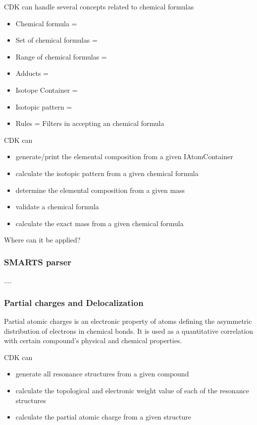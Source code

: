 \documentclass[10pt]{bmc_article}
\newenvironment{bmcformat}{\begin{raggedright}\baselineskip20pt\sloppy\setboolean{publ}{false}}{\end{raggedright}\baselineskip20pt\sloppy}
\begin{document}
\begin{bmcformat}
CDK can handle several concepts related to chemical formulas
\begin{itemize}
\item Chemical formula =
\item Set of chemical formulas =
\item Range of chemical formulas =
\item Adducts =
\item Isotope Container =
\item Isotopic pattern = 
\item Rules = Filters in accepting an chemical formula
\end{itemize}

CDK can
\begin{itemize}
\item generate/print the elemental composition from a given IAtomContainer
\item calculate the isotopic pattern from a given chemical formula
\item determine the elemental composition from a given mass
\item validate a chemical formula
\item calculate the exact mass from a given chemical formula
\end{itemize}

Where can it be applied?

  \subsubsection*{SMARTS parser}
  
  ....

  \subsubsection*{Partial charges and Delocalization}
  
Partial atomic charges is an electronic property of atoms defining the asymmetric distribution of electrons in chemical bonds.
It is used as a quantitative correlation with certain compound's physical and chemical properties.

CDK can
\begin{itemize}
\item generate all resonance structures from a given compound 
\item calculate the topological and electronic weight value of each of the resonance structures
\item calculate the partial atomic charge from a given structure 
\end{itemize}


\end{bmcformat}
\end{document}
